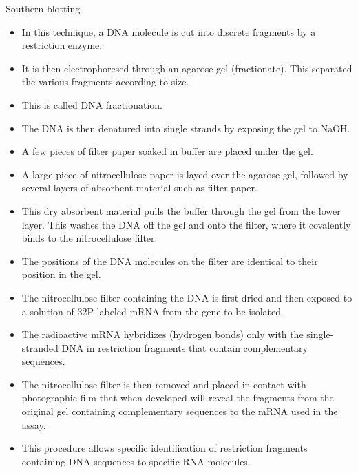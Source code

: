 \documentclass[11pt,dvipsnames,ignorenonframetext,aspectratio=169]{beamer}
\providecommand{\tightlist}{%
  \setlength{\itemsep}{0pt}\setlength{\parskip}{0pt}}
\begin{document}
\begin{frame}{Southern blotting}
\protect\hypertarget{southern-blotting}{}
\begin{itemize}
\tightlist
\item
  In this technique, a DNA molecule is cut into discrete fragments by a
  restriction enzyme.
\item
  It is then electrophoresed through an agarose gel (fractionate). This
  separated the various fragments according to size.
\item
  This is called DNA fractionation.
\item
  The DNA is then denatured into single strands by exposing the gel to
  NaOH.
\item
  A few pieces of filter paper soaked in buffer are placed under the
  gel.
\item
  A large piece of nitrocellulose paper is layed over the agarose gel,
  followed by several layers of absorbent material such as filter paper.
\item
  This dry absorbent material pulls the buffer through the gel from the
  lower layer. This washes the DNA off the gel and onto the filter,
  where it covalently binds to the nitrocellulose filter.
\end{itemize}
\end{frame}

\begin{frame}{}
\protect\hypertarget{section-27}{}
\begin{itemize}
\tightlist
\item
  The positions of the DNA molecules on the filter are identical to
  their position in the gel.
\item
  The nitrocellulose filter containing the DNA is first dried and then
  exposed to a solution of 32P labeled mRNA from the gene to be
  isolated.
\item
  The radioactive mRNA hybridizes (hydrogen bonds) only with the
  single-stranded DNA in restriction fragments that contain
  complementary sequences.
\item
  The nitrocellulose filter is then removed and placed in contact with
  photographic film that when developed will reveal the fragments from
  the original gel containing complementary sequences to the mRNA used
  in the assay.
\item
  This procedure allows specific identification of restriction fragments
  containing DNA sequences to specific RNA molecules.
\end{itemize}
\end{frame}
\end{document}
